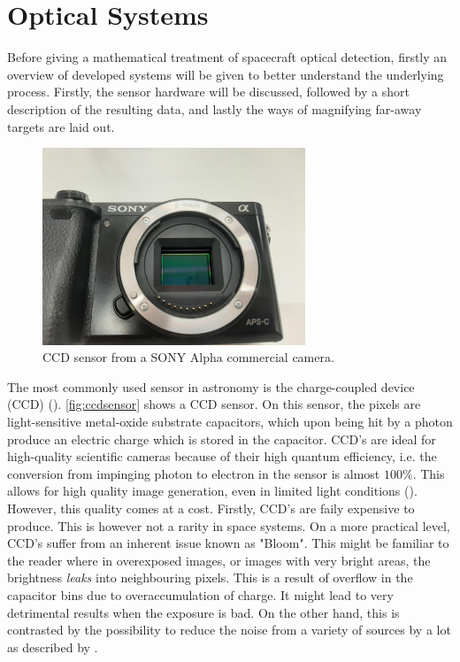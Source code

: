 \section{Optical Systems}
\label{sec:opticalhardware}
Before giving a mathematical treatment of spacecraft optical detection, firstly an overview of developed systems will be given to better understand the underlying process. Firstly, the sensor hardware will be discussed, followed by a short description of the resulting data, and lastly the ways of magnifying far-away targets are laid out.\\
\begin{figure}[htbp]
    \centering
    \includegraphics[width=0.7\textwidth]{images/sensor.jpeg}
    \caption{CCD sensor from a SONY Alpha commercial camera.}
    \label{fig:ccdsensor}
\end{figure}
The most commonly used sensor in astronomy is the charge-coupled device (CCD) (\cite{CCDimage}). \autoref{fig:ccdsensor} shows a CCD sensor. On this sensor, the pixels are light-sensitive metal-oxide substrate capacitors, which upon being hit by a photon produce an electric charge which is stored in the capacitor. CCD's are ideal for high-quality scientific cameras because of their high quantum efficiency, i.e. the conversion from impinging photon to electron in the sensor is almost $100\%$. This allows for high quality image generation, even in limited light conditions (\cite{CCDimage}). However, this quality comes at a cost. Firstly, CCD's are faily expensive to produce. This is however not a rarity in space systems. On a more practical level, CCD's suffer from an inherent issue known as "Bloom". This might be familiar to the reader where in overexposed images, or images with very bright areas, the brightness \textit{leaks} into neighbouring pixels. This is a result of overflow in the capacitor bins due to overaccumulation of charge. It might lead to very detrimental results when the exposure is bad. On the other hand, this is contrasted by the possibility to reduce the noise from a variety of sources by a lot as described by \cite{CCDsignal}.\\

